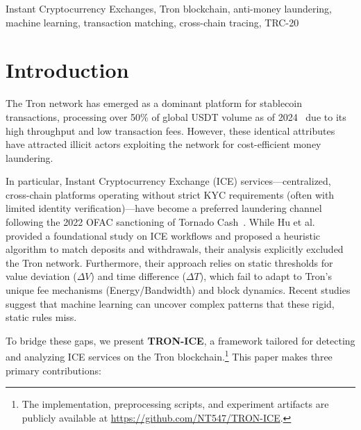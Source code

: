 \documentclass[journal]{IEEEtran}
\begin{document}
    \begin{IEEEkeywords}
    Instant Cryptocurrency Exchanges, Tron blockchain, anti-money laundering, machine learning, transaction matching, cross-chain tracing, TRC-20
    \end{IEEEkeywords}
    
    \section{Introduction}
    
    The Tron network has emerged as a dominant platform for stablecoin transactions, processing over 50\% of global USDT volume as of 2024~\cite{chainalysis2024} due to its high throughput and low transaction fees. However, these identical attributes have attracted illicit actors exploiting the network for cost-efficient money laundering. 
    
    In particular, Instant Cryptocurrency Exchange (ICE) services—centralized, cross-chain platforms operating without strict KYC requirements (often with limited identity verification)—have become a preferred laundering channel following the 2022 OFAC sanctioning of Tornado Cash~\cite{ofac2022}. While Hu et al.~\cite{hu2024ice} provided a foundational study on ICE workflows and proposed a heuristic algorithm to match deposits and withdrawals, their analysis explicitly excluded the Tron network. Furthermore, their approach relies on static thresholds for value deviation ($\Delta V$) and time difference ($\Delta T$), which fail to adapt to Tron's unique fee mechanisms (Energy/Bandwidth) and block dynamics. Recent studies~\cite{lam2024usdt, xia2024token} suggest that machine learning can uncover complex patterns that these rigid, static rules miss.
    
    To bridge these gaps, we present \textbf{TRON-ICE}, a framework tailored for detecting and analyzing ICE services on the Tron blockchain.\footnote{The implementation, preprocessing scripts, and experiment artifacts are publicly available at \url{https://github.com/NT547/TRON-ICE}.} This paper makes three primary contributions:
    
\end{document}
